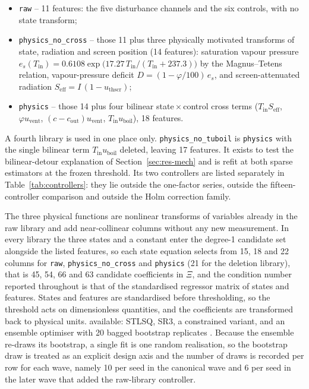 \begin{itemize}
\item \texttt{raw} -- 11 features: the five disturbance channels and the six controls,
      with no state transform;
\item \texttt{physics\_no\_cross} -- those 11 plus three physically motivated transforms
      of state, radiation and screen position (14 features): saturation vapour pressure
      $e_s(T_{\mathrm{in}})=0.6108\exp\bigl(17.27\,T_{\mathrm{in}}/(T_{\mathrm{in}}+237.3)\bigr)$
      by the Magnus--Tetens relation, vapour-pressure deficit $D=(1-\varphi/100)\,e_s$,
      and screen-attenuated radiation $S_{\mathrm{eff}}=I\,(1-u_{\mathrm{thscr}})$;
\item \texttt{physics} -- those 14 plus four bilinear state\,$\times$\,control cross
      terms ($T_{\mathrm{in}}S_{\mathrm{eff}}$, $\varphi u_{\mathrm{vent}}$,
      $(c-c_{\mathrm{out}})u_{\mathrm{vent}}$, $T_{\mathrm{in}}u_{\mathrm{boil}}$),
      18 features.
\end{itemize}

A fourth library is used in one place only. \texttt{physics\_no\_tuboil} is
\texttt{physics} with the single bilinear term $T_{\mathrm{in}}u_{\mathrm{boil}}$
deleted, leaving 17 features. It exists to test the bilinear-detour explanation of
Section~\ref{sec:res-mech} and is refit at both sparse estimators at the frozen
threshold. Its two controllers are listed separately in
Table~\ref{tab:controllers}: they lie outside the one-factor series, outside the
fifteen-controller comparison and outside the Holm correction family.

The three physical functions are nonlinear transforms of variables already in the raw
library and add near-collinear columns without any new measurement. In every library the
three states and a constant enter the degree-1 candidate set alongside the listed
features, so each state equation selects from 15, 18 and 22 columns for \texttt{raw},
\texttt{physics\_no\_cross} and \texttt{physics} (21 for the deletion library), that is
45, 54, 66 and 63 candidate coefficients in $\Xi$, and the condition number reported
throughout is that of the standardised regressor matrix of states and features. States
and features are standardised before thresholding, so the threshold acts on
dimensionless quantities, and the coefficients are transformed back to physical units.
available: STLSQ, SR3, a constrained variant, and an ensemble optimiser with 20 bagged
bootstrap replicates \cite{fasel2022}. Because the ensemble re-draws its bootstrap, a
single fit is one random realisation, so the bootstrap draw is treated as an explicit
design axis and the number of draws is recorded per row for each wave, namely 10 per
seed in the canonical wave and 6 per seed in the later wave that added the raw-library
controller.

